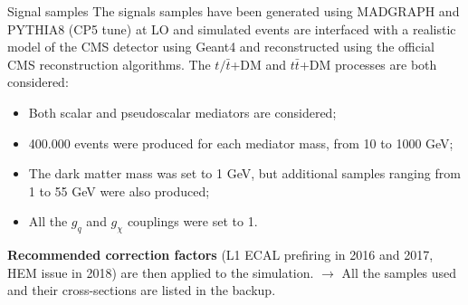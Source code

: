 \documentclass[8pt]{beamer}
\begin{document}
\begin{frame}{Signal samples}
\justifying
The \alert{signals samples have been generated} using MADGRAPH and PYTHIA8 (CP5 tune) at LO and simulated events are interfaced with a realistic model of the CMS detector using Geant4 and reconstructed using the official CMS reconstruction algorithms. \vfill
The $t/\bar t$+DM and $t \bar t$+DM processes are both considered:

\begin{itemize}
\item Both scalar and pseudoscalar mediators are considered;
\item 400.000 events were produced for each mediator mass, from 10 to 1000 GeV;
\item The dark matter mass was set to 1 GeV, but additional samples ranging from 1 to 55 GeV were also produced;
\item All the $g_q$ and $g_\chi$ couplings were set to 1.
\end{itemize} \vfill

\textbf{Recommended correction factors} (L1 ECAL prefiring in 2016 and 2017, HEM issue in 2018) are then applied to the simulation. \vfill 
$\rightarrow$ All the samples used and their cross-sections are listed in the backup. \vfill
\end{frame}
\end{document}
